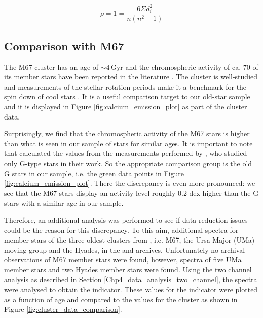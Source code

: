 \begin{equation}
    \rho = 1 = \frac{6\Sigma d_{i}^{2}}{n(n^{2}-1)}
    \label{Eq:spearman_rank_coeff}
\end{equation}

\subsection{Comparison with M67}
The M67 cluster has an age of $\sim 4$\,Gyr \citep{Demarque_etal_1992,VandenBerg_Stetson_2004,Bellini_etal_2010} and the chromospheric activity of ca. 70 of its member stars have been reported in the literature \citep{Giampapa_etal_2006,Mamajek_Hillenbrand_2008}. The cluster is well-studied and measurements of the stellar rotation periods make it a benchmark for the spin down of cool stars \citep{Barnes_etal_2016}. It is a useful comparison target to our old-star sample and it is displayed in Figure \ref{fig:calcium_emission_plot} as part of the \citet{Mamajek_Hillenbrand_2008} cluster data.

Surprisingly, we find that the chromospheric activity of the M67 stars is higher than what is seen in our sample of stars for similar ages. It is important to note that \citet{Mamajek_Hillenbrand_2008} calculated the \Rprime values from the measurements performed by \citet{Giampapa_etal_2006}, who studied only G-type stars in their work. So the appropriate comparison group is the old G stars in our sample, i.e. the green data points in Figure \ref{fig:calcium_emission_plot}. There the discrepancy is even more pronounced: we see that the M67 stars display an activity level roughly 0.2 dex higher than the G stars with a similar age in our sample.

Therefore, an additional analysis was performed to see if data reduction issues could be the reason for this discrepancy. To this aim, additional spectra for member stars of the three oldest clusters from \citet{Mamajek_Hillenbrand_2008}, i.e. M67, the Ursa Major (UMa) moving group and the Hyades, in the \esp and \narval archives. Unfortunately no archival observations of M67 member stars were found, however, spectra of five UMa member stars and two Hyades member stars were found. Using the two channel analysis as described in Section \ref{Chp4_data_analysis_two_channel}, the spectra were analysed to obtain the \Rprime indicator. These values for the \Rprime indicator were plotted as a function of age and compared to the \citet{Mamajek_Hillenbrand_2008} values for the cluster as shown in Figure \ref{fig:cluster_data_comparison}. 


